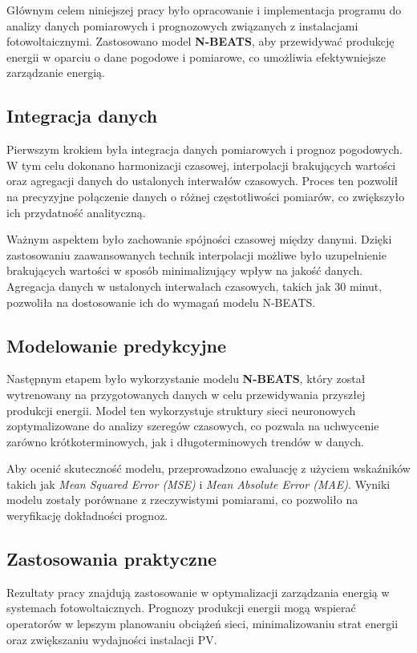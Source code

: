 \documentclass[a4paper,fleqn,final]{cas-dc}\usepackage[authoryear,longnamesfirst]{natbib}
\begin{document}
Głównym celem niniejszej pracy było opracowanie i implementacja programu do analizy danych pomiarowych i prognozowych związanych z instalacjami fotowoltaicznymi. Zastosowano model \textbf{N-BEATS}, aby przewidywać produkcję energii w oparciu o dane pogodowe i pomiarowe, co umożliwia efektywniejsze zarządzanie energią.

\subsection{Integracja danych}
Pierwszym krokiem była integracja danych pomiarowych i prognoz pogodowych. W tym celu dokonano harmonizacji czasowej, interpolacji brakujących wartości oraz agregacji danych do ustalonych interwałów czasowych. Proces ten pozwolił na precyzyjne połączenie danych o różnej częstotliwości pomiarów, co zwiększyło ich przydatność analityczną.

Ważnym aspektem było zachowanie spójności czasowej między danymi. Dzięki zastosowaniu zaawansowanych technik interpolacji możliwe było uzupełnienie brakujących wartości w sposób minimalizujący wpływ na jakość danych. Agregacja danych w ustalonych interwałach czasowych, takich jak 30 minut, pozwoliła na dostosowanie ich do wymagań modelu N-BEATS.

\subsection{Modelowanie predykcyjne}
Następnym etapem było wykorzystanie modelu \textbf{N-BEATS}, który został wytrenowany na przygotowanych danych w celu przewidywania przyszłej produkcji energii. Model ten wykorzystuje struktury sieci neuronowych zoptymalizowane do analizy szeregów czasowych, co pozwala na uchwycenie zarówno krótkoterminowych, jak i długoterminowych trendów w danych.

Aby ocenić skuteczność modelu, przeprowadzono ewaluację z użyciem wskaźników takich jak \textit{Mean Squared Error (MSE)} i \textit{Mean Absolute Error (MAE)}. Wyniki modelu zostały porównane z rzeczywistymi pomiarami, co pozwoliło na weryfikację dokładności prognoz.

\subsection{Zastosowania praktyczne}
Rezultaty pracy znajdują zastosowanie w optymalizacji zarządzania energią w systemach fotowoltaicznych. Prognozy produkcji energii mogą wspierać operatorów w lepszym planowaniu obciążeń sieci, minimalizowaniu strat energii oraz zwiększaniu wydajności instalacji PV. 
\end{document}
